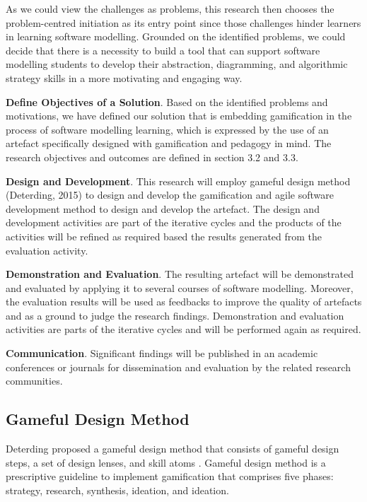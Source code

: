 \documentclass[12pt, a4paper]{report}
\begin{document}
As we could view the challenges as problems, this research then chooses the problem-centred initiation as its entry point since those challenges hinder learners in learning software modelling.  Grounded on the identified problems, we could decide that there is a necessity to build a tool that can support software modelling students to develop their abstraction, diagramming, and algorithmic strategy skills in a more motivating and engaging way. 

\textbf{Define Objectives of a Solution}. Based on the identified problems and motivations, we have defined our solution that is embedding gamification in the process of software modelling learning, which is expressed by the use of an artefact specifically designed with gamification and pedagogy in mind. The research objectives and outcomes are defined in section 3.2 and 3.3.

\textbf{Design and Development}. This research will employ gameful design method (Deterding, 2015) to design and develop the gamification and agile software development method to design and develop the artefact. The design and development activities are part of the iterative cycles and the products of the activities will be refined as required based the results generated from the evaluation activity.

\textbf{Demonstration and Evaluation}. The resulting artefact will be demonstrated and evaluated by applying it to several courses of software modelling. Moreover, the evaluation results will be used as feedbacks to improve the quality of artefacts and as a ground to judge the research findings.  Demonstration and evaluation activities are parts of the iterative cycles and will be performed again as required. 

\textbf{Communication}. Significant findings will be published in an academic conferences or journals for dissemination and evaluation by the related research communities.


 
\subsection{Gameful Design Method}
Deterding proposed a gameful design method that consists of gameful design steps, a set of design lenses, and skill atoms \cite{deterding2015lens}. Gameful design method is a prescriptive guideline to implement gamification that comprises five phases: strategy, research, synthesis, ideation, and ideation. 
\end{document}
